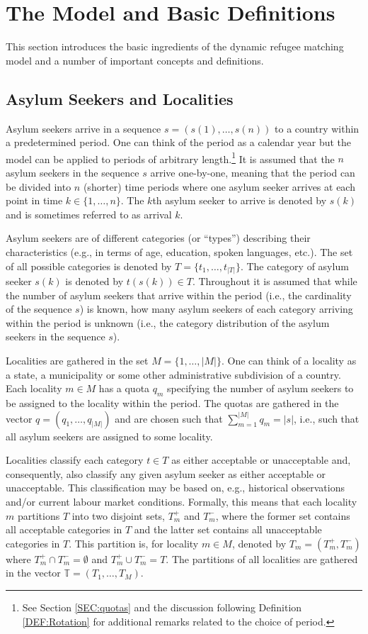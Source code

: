 \documentclass[12pt,fleqn]{article}
\begin{document}
\section{The Model and Basic Definitions}\label{SEC:Model}
This section introduces the basic ingredients of the dynamic refugee matching model and a number of important concepts and definitions.

\subsection{Asylum Seekers and Localities}
Asylum seekers arrive in a sequence $s=(s(1),\ldots,s(n))$ to a country within a predetermined period. One can think of the period as a calendar year but the model can be applied to periods of arbitrary length.\footnote{See Section \ref{SEC:quotas} and the discussion following Definition \ref{DEF:Rotation} for additional remarks related to the choice of period.} It is assumed that the $n$ asylum seekers in the sequence $s$ arrive one-by-one, meaning that the period can be divided into $n$ (shorter) time periods where one asylum seeker arrives at each point in time $k\in\{1,\ldots,n\}$. The $k$th asylum seeker to arrive is denoted by $s(k)$ and is sometimes referred to as arrival $k$.

Asylum seekers are of different categories (or ``types'') describing their characteristics (e.g., in terms of age, education, spoken languages, etc.). The set of all possible categories is denoted by $T=\{t_1,\ldots,t_{|T|}\}$. The category of asylum seeker $s(k)$ is denoted by $t(s(k))\in T$. Throughout it is assumed that while the number of asylum seekers that arrive within the period (i.e., the cardinality of the sequence $s$) is known, how many asylum seekers of each category arriving within the period is unknown (i.e., the category distribution of the asylum seekers in the sequence $s$).

Localities are gathered in the set $M=\{1,\ldots,|M|\}$. One can think of a locality as a state, a municipality or some other administrative subdivision of a country. Each locality $m\in M$ has a quota $q_m$ specifying the number of asylum seekers 
to be assigned to the locality within the period. The quotas are gathered in the vector $q=(q_1,\ldots, q_{|M|})$ and are chosen such that $\sum_{m=1}^{|M|}q_m=|s|$, i.e., such that all asylum seekers are assigned to some locality.

Localities classify each category $t\in T$ as either acceptable or unacceptable and, consequently, also classify any given asylum seeker as either acceptable or unacceptable. This classification may be based on, e.g., historical observations and/or current labour market conditions. Formally, this means that each locality $m$ partitions $T$ into two disjoint sets, $T^+_m$ and $T_m^-$, where the former set contains all acceptable categories in $T$ and the latter set contains all unacceptable categories in $T$. This partition is, for locality $m\in M$, denoted by $T_m=(T^+_m, T_m^-)$ where $T^+_m\cap T_m^-=\emptyset$ and $T^+_m\cup T_m^-=T$. The partitions of all localities are gathered in the vector $\mathbb{T}=(T_1,\ldots,T_M)$.
\end{document}

